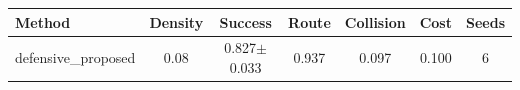 \begin{tabular}{lcccccc}
\toprule
Method & Density & Success & Route & Collision & Cost & Seeds \\ 
\midrule
defensive_proposed & 0.08 & 0.827$\pm$0.033 & 0.937 & 0.097 & 0.100 & 6 \\ 
\bottomrule
\end{tabular}
